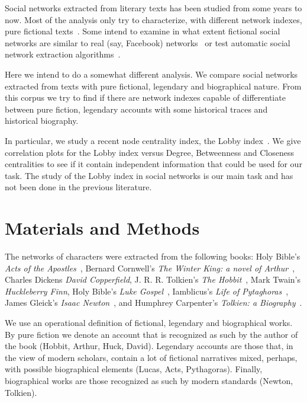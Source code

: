 \documentclass[review]{elsarticle}
\begin{document}
Social networks extracted from literary texts has been studied from some
years to now. Most of the analysis only try to characterize,
with different network indexes, pure fictional 
texts~\cite{choi2007directed,mac2012universal,
agarwal2012social,mac2013quantitative,kenna2016maths,ribeiro2016complex}. 
Some intend to examine in what extent
fictional social networks are similar to real (say, Facebook)
networks~\cite{alberich2002marvel,gleiser2007become} 
or test automatic social network
extraction algorithms~\cite{elson2010extracting,grayson2016sense}. 

Here we intend to do a somewhat different analysis. 
We compare social networks
extracted from texts with pure fictional, legendary and biographical nature. 
From this corpus we try to find if there are network indexes capable of
differentiate between pure fiction, legendary accounts with some 
historical traces and historical biography. 

In particular, we study a recent node centrality index, the Lobby 
index~\cite{korn2009lobby,campiteli2013lobby,lu2016h}. We give
correlation plots for the Lobby index versus Degree, Betweenness and 
Closeness centralities to see if it contain
independent information that could be used for our task.
The study of the Lobby index in social networks is our main task
and has not been done in the previous literature.

\section{Materials and Methods}
\label{Methods}

The networks of characters were extracted from the following books:
Holy Bible's \emph{Acts of the Apostles}~\cite{holybible}, 
Bernard Cornwell's \emph{The Winter King: a novel of
Arthur}~\cite{cornwell2007winter},
Charles Dickens \emph{David Copperfield},
J. R. R. Tolkien's \emph{The Hobbit}~\cite{tolkien2012hobbit}, 
Mark Twain's \emph{Huckleberry Finn}, 
Holy Bible's \emph{Luke Gospel}~\cite{holybible}, 
Iamblicus's \emph{Life of Pytaghoras}~\cite{taylor1986iamblichus}, 
James Gleick's \emph{Isaac Newton}~\cite{gleick2003isaac}, and
Humphrey Carpenter's \emph{Tolkien: a Biography}~\cite{carpenter2014jrr}. 

We use an operational definition of fictional, legendary and biographical
works. By pure fiction we denote an account that is recognized as such
by the author of the book (Hobbit, Arthur, Huck, David). 
Legendary accounts are those that, in the view of modern scholars,
contain a lot of fictional narratives mixed, perhaps, 
with possible biographical elements (Lucas, Acts, Pythagoras).
Finally, biographical works are those recognized as such by
modern standards (Newton, Tolkien). 
\end{document}
